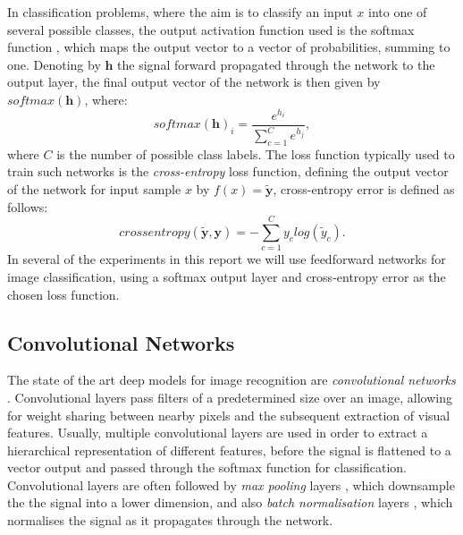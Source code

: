 In classification problems, where the aim is to classify an input $x$ into one of several possible classes, the output activation function used is the softmax function \cite{Theodoridis2009}, which maps the output vector to a vector of probabilities, summing to one. Denoting by $\mathbf{h}$ the signal forward propagated through the network to the output layer, the final output vector of the network is then given by $softmax(\mathbf{h})$, where:
\begin{equation}
softmax(\mathbf{h})_i = \frac{e^{h_i}}{\sum_{c=1}^Ce^{h_j}},
\end{equation}
where $C$ is the number of possible class labels. The loss function typically used to train such networks is the \textit{cross-entropy} loss function, defining the output vector of the network for input sample $x$ by $f(x) = \tilde{\mathbf{y}}$, cross-entropy error is defined as follows:
\begin{equation}
cross entropy(\tilde{\mathbf{y}},\mathbf{y}) = - \sum_{c=1}^{C} y_{c} log(\tilde{y}_{c}).
\end{equation}
In several of the experiments in this report we will use feedforward networks for image classification, using a softmax output layer and cross-entropy error as the chosen loss function. 

\subsection{Convolutional Networks}\label{sec:convnets}
The state of the art deep models for image recognition are \textit{convolutional networks} \cite{lecun2015deep} \cite{bengio2012practical}. Convolutional layers pass filters of a predetermined size over an image, allowing for weight sharing between nearby pixels and the subsequent extraction of visual features. Usually, multiple convolutional layers are used in order to extract a hierarchical representation of different features, before the signal is flattened to a vector output and passed through the softmax function for classification. Convolutional layers are often followed by \textit{max pooling} layers \cite{nagi2011max}, which downsample the the signal into a lower dimension, and also \textit{batch normalisation} layers \cite{ioffe2015batch}, which normalises the signal as it propagates through the network. 

